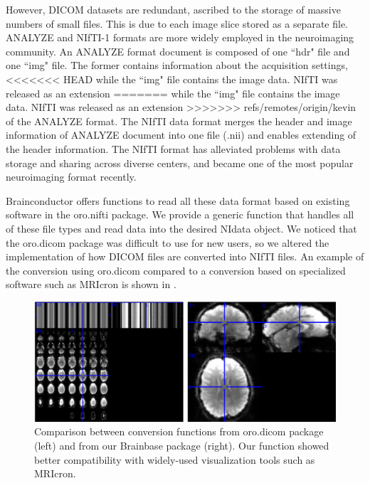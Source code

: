 \documentclass{nature}
\begin{document}
However, DICOM datasets are redundant, ascribed to the storage of massive
numbers of small files. This is due to each image slice stored as a separate
file. ANALYZE and NIfTI-1 formats are more widely employed in the neuroimaging
community. An ANALYZE format document is composed of one ``hdr" file and one
``img" file. The former contains information about the acquisition settings,
<<<<<<< HEAD
while the ``img" file contains the image data. NIfTI was released as an extension
=======
while the ``img" file contains the image data. NIfTI was released as an
extension
>>>>>>> refs/remotes/origin/kevin
of the ANALYZE format. The NIfTI data format merges the header and image
information of ANALYZE document into one file (.nii) and enables extending of
the header information. The NIfTI format has alleviated problems with data
storage and sharing across diverse centers, and became one of the most popular
neuroimaging format recently.

Brainconductor offers functions to read all these data format
based on existing software in the oro.nifti package. We
provide a generic function that handles all of these file types and read data
into the desired NIdata object.
We noticed that the oro.dicom package was difficult to use for new users, so
we altered the implementation of how DICOM files are converted into NIfTI 
files. An example of the conversion using oro.dicom compared to a conversion
based on specialized software such as MRIcron\cite{rorden2011mricro} is
shown in .

\begin{figure}[tb]
\centering
\includegraphics[width=400pt]{fig/brainconductor/dicom.png}

\caption{Comparison between conversion functions from oro.dicom package (left)
and from our Brainbase  package (right).  Our function showed better
compatibility  with widely-used visualization tools such as MRIcron.}
\label{fig:dicom}
\end{figure}
\end{document}
